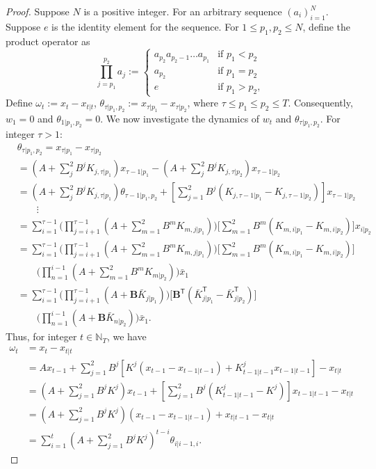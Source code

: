 \documentclass[letterpaper, 10 pt, conference]{ieeeconf}  %
\begin{document}
\begin{proof}
    Suppose $N$ is a positive integer. For an arbitrary sequence $(a_{i})_{i=1}^{N}$. Suppose $e$ is the identity element for the sequence. For $1\leq p_{1},p_{2}\leq N$, define the product operator as
\begin{equation*}
    \prod_{j=p_{1}}^{p_{2}} a_{j} := 
    \begin{cases}
        a_{p_{2}}a_{p_{2}-1}\dots a_{p_{1}} & \text{if $p_{1} < p_{2}$}\\
        a_{p_{2}} & \text{if $p_{1} = p_{2}$}\\
        e & \text{if $p_{1} > p_{2}$},
    \end{cases}
\end{equation*}
Define $\omega_{t} := x_{t}-x_{t|t}$, $\theta_{\tau| p_{1},p_{2}} := x_{\tau|p_{1}}-x_{\tau|p_{2}}$, where $\tau \leq p_{1}\leq p_{2}\leq T$. Consequently, $w_{1} = 0$ and $\theta_{1|p_{1},p_{2}}=0$. We now investigate the dynamics of $w_{t}$ and $\theta_{\tau|p_{1},p_{2}}$. For integer $\tau > 1$:
\begin{align*}
    &\theta_{\tau|p_{1},p_{2}}= x_{\tau|p_{1}}-x_{\tau|p_{2}}\\
    &= (A+\sum_{j}^{2}B^{j}K_{j,\tau|p_{1}})x_{\tau-1|p_{1}} - (A+\sum_{j}^{2}B^{j}K_{j,\tau|p_{2}})x_{\tau-1|p_{2}}\\
    &= (A+\sum_{j}^{2}B^{j}K_{j,\tau|p_{1}})\theta_{\tau-1|p_{1},p_{2}} + [\sum_{j=1}^{2} B^{j}(K_{j,\tau-1|p_{1}}-K_{j,\tau-1|p_{2}})]x_{\tau-1|p_{2}}\\
    &\qquad \vdots\\
    &= \sum_{i=1}^{\tau-1}\bigg(\prod_{j=i+1}^{\tau-1}(A+\sum_{m=1}^{2}B^{m}K_{m,j|p_{1}})\bigg)\bigg[\sum_{m=1}^{2}B^{m}(K_{m,i|p_{1}}-K_{m,i|p_{2}})\bigg]x_{i|p_{2}}  \\
    &= \sum_{i=1}^{\tau-1}\bigg(\prod_{j=i+1}^{\tau-1}(A+\sum_{m=1}^{2}B^{m}K_{m,j|p_{1}})\bigg)\bigg[\sum_{m=1}^{2}B^{m}(K_{m,i|p_{1}}-K_{m,i|p_{2}})\bigg]\\
    &\qquad\bigg(\prod_{n=1}^{i-1} (A+\sum_{m=1}^{2}B^{m}K_{m|p_{2}})\bigg)\bar{x}_{1}\\
    &= \sum_{i=1}^{\tau-1}\bigg(\prod_{j=i+1}^{\tau-1}(A+\mathbf{B}\bar{K}_{j|p_{1}})\bigg)\bigg[\mathbf{B}^{\mathsf{T}}(\bar{K}_{j|p_{1}}^{\mathsf{T}}-\bar{K}_{j|p_{2}}^{\mathsf{T}})\bigg]\\
    &\qquad\bigg(\prod_{n=1}^{i-1}(A+\mathbf{B}\bar{K}_{n|p_{2}})\bigg)\bar{x}_{1}.
\end{align*}
Thus, for integer $t\in\mathbb{N}_T$, we have
\begin{align*}
    \omega_{t} &= x_{t} - x_{t|t}\\
    &= Ax_{t-1} + \sum_{j=1}^{2}B^{j}[K^{j}(x_{t-1}-x_{t-1|t-1})+K_{t-1|t-1}^{j}x_{t-1|t-1}] - x_{t|t}\\
    &= (A+\sum_{j=1}^{2}B^{j}K^{j})x_{t-1} + [\sum_{j=1}^{2}B^{j}(K_{t-1|t-1}^{j}-K^{j})]x_{t-1|t-1} - x_{t|t}\\
    &= (A+\sum_{j=1}^{2}B^{j}K^{j})(x_{t-1}-x_{t-1|t-1}) + x_{t|t-1}-x_{t|t}\\
    &= \sum_{i=1}^{t} (A+\sum_{j=1}^{2}B^{j}K^{j})^{t-i} \theta_{i|i-1,i}.
\end{align*}


\end{proof}
\end{document}
